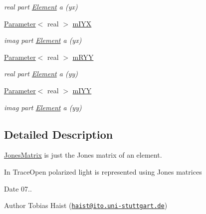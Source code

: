 \begin{DoxyCompactItemize}
\begin{DoxyCompactList}\small\item\em real part \hyperlink{classElement}{Element} a (yx) \end{DoxyCompactList}\item 
\hyperlink{classParameter}{Parameter}$<$ real $>$ \hyperlink{classJonesMatrix_ad19c69bc677f85490ccbfada95b9474f}{m\+I\+YX}\hypertarget{classJonesMatrix_ad19c69bc677f85490ccbfada95b9474f}{}\label{classJonesMatrix_ad19c69bc677f85490ccbfada95b9474f}

\begin{DoxyCompactList}\small\item\em imag part \hyperlink{classElement}{Element} a (yx) \end{DoxyCompactList}\item 
\hyperlink{classParameter}{Parameter}$<$ real $>$ \hyperlink{classJonesMatrix_aa3285508a9c7ad25250eb0d7511e9988}{m\+R\+YY}\hypertarget{classJonesMatrix_aa3285508a9c7ad25250eb0d7511e9988}{}\label{classJonesMatrix_aa3285508a9c7ad25250eb0d7511e9988}

\begin{DoxyCompactList}\small\item\em real part \hyperlink{classElement}{Element} a (yy) \end{DoxyCompactList}\item 
\hyperlink{classParameter}{Parameter}$<$ real $>$ \hyperlink{classJonesMatrix_a44a73c7ef4adeffe8c825618668f344f}{m\+I\+YY}\hypertarget{classJonesMatrix_a44a73c7ef4adeffe8c825618668f344f}{}\label{classJonesMatrix_a44a73c7ef4adeffe8c825618668f344f}

\begin{DoxyCompactList}\small\item\em imag part \hyperlink{classElement}{Element} a (yy) \end{DoxyCompactList}\end{DoxyCompactItemize}


\subsection{Detailed Description}
\hyperlink{classJonesMatrix}{Jones\+Matrix} is just the Jones matrix of an element. 

In Trace\+Open polarized light is represented using Jones matrices

\begin{DoxyDate}{Date}
07.. 
\end{DoxyDate}
\begin{DoxyAuthor}{Author}
Tobias Haist (\href{mailto:haist@ito.uni-stuttgart.de}{\tt haist@ito.\+uni-\/stuttgart.\+de}) 
\end{DoxyAuthor}


